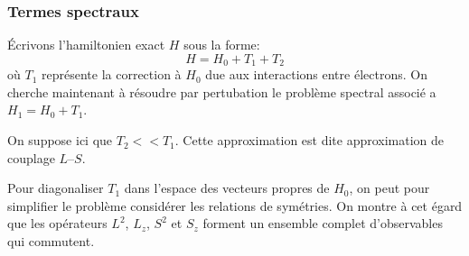 \documentclass[12pt]{book}
\begin{document}
\subsubsection{Termes spectraux}
\'Ecrivons l'hamiltonien exact $H$ sous la forme:
\begin{equation}
H=H_0+T_1+T_2
\end{equation}
o\`u $T_1$ repr\'esente la correction \`a $H_0$ due aux interactions
entre \'electrons.
On cherche maintenant \`a r\'esoudre par pertubation le probl\`eme
spectral associ\'e a $H_1=H_0+T_1$.
\begin{rem}
On suppose ici que $T_2<<T_1$. Cette approximation est dite
approximation de couplage $L$--$S$.
\end{rem}
Pour diagonaliser $T_1$ dans l'espace des vecteurs propres de $H_0$,
on peut pour simplifier le probl\`eme consid\'erer les relations de
sym\'etries. On montre \`a cet \'egard que les op\'erateurs $L^2$, $L_z$,
$S^2$ et 
$S_z$ forment un ensemble complet d'observables qui commutent.
\end{document}
